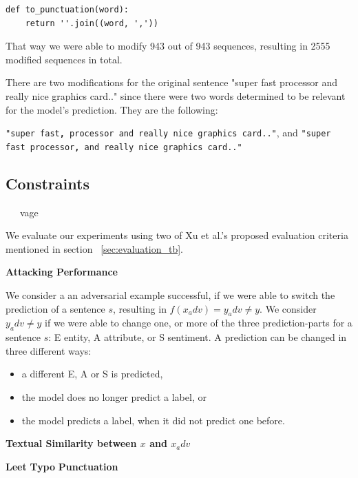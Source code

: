 \begin{lstlisting}
def to_punctuation(word):
    return ''.join((word, ','))
\end{lstlisting}

That way we were able to modify 943 out of 943 sequences, resulting in 2555 modified sequences in total. 

There are two modifications for the original sentence "super fast processor and really nice graphics card.." since there were two words determined to be relevant for the model's prediction. They are the following:

\texttt{"super fast\textbf{,} processor and really nice graphics card.."}, and
\texttt{"super fast processor\textbf{,} and really nice graphics card.."}

\subsection{Constraints}
    \label{sec:constraints_m}
~~~vage~~

We evaluate our experiments using two of Xu et al.'s proposed evaluation criteria mentioned in section ~\ref{sec:evaluation_tb}. 

\textbf{Attacking Performance}

We consider a an adversarial example successful, if we were able to switch the prediction of a sentence $s$, resulting in ${f(x_adv ) = y_adv \neq y}$.
We consider ${y_adv \neq y}$ if we were able to change one, or more of the three prediction-parts for a sentence $s$: E entity, A attribute, or S sentiment. 
A prediction can be changed in three different ways:
\begin{itemize}
\item a different E, A or S is predicted,
\item the model does no longer predict a label, or
\item the model predicts a label, when it did not predict one before.
\end{itemize}

\textbf{Textual Similarity between $x$ and $x_adv$}

\textbf{Leet}
\textbf{Typo}
\textbf{Punctuation}


